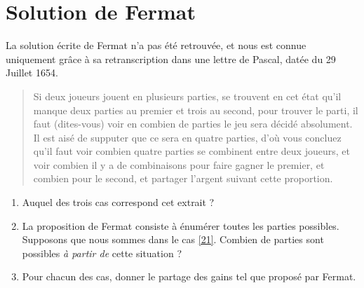 \documentclass{article}
\begin{document}
\section{Solution de Fermat}

La solution écrite de Fermat n'a pas été retrouvée, et nous est connue uniquement grâce à sa retranscription dans une lettre de Pascal, datée du 29 Juillet 1654.

\begin{quote}
\og Si deux joueurs jouent en plusieurs parties, se trouvent en cet état qu'il manque deux parties au premier et trois au second, pour trouver le parti, il faut (dites-vous) voir en combien de parties le jeu sera décidé absolument. Il est aisé de supputer que ce sera en quatre parties, d'où vous concluez qu'il faut voir combien quatre parties se combinent entre deux joueurs, et voir combien il y a de combinaisons pour faire gagner le premier, et combien pour le second, et partager l'argent suivant cette proportion. \fg 
\end{quote}

\begin{enumerate}[label=\textbf{Question \arabic*}\hfill]
\item Auquel des trois cas correspond cet extrait ?
\item La proposition de Fermat consiste à énumérer toutes les parties possibles. Supposons que nous sommes dans le cas \ref{21}. Combien de parties sont possibles \emph{à partir de} cette situation ?
\item Pour chacun des cas, donner le partage des gains tel que proposé par Fermat.
\end{enumerate}

\newpage
\setcounter{section}{0}

\maketitle
\thispagestyle{fancy}
\fancyhead[r]{}
\fancyfoot{}
\end{document}

